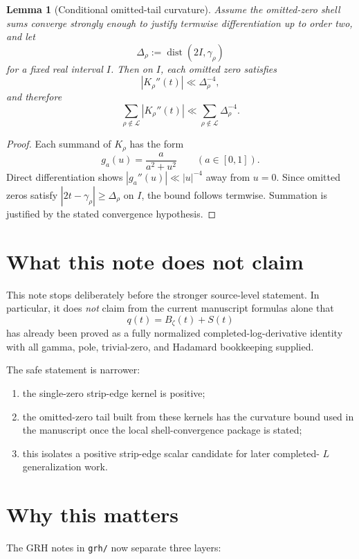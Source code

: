 \documentclass[11pt]{article}
\newtheorem{lemma}{Lemma}
\begin{document}
\begin{lemma}[Conditional omitted-tail curvature]
Assume the omitted-zero shell sums converge strongly enough to justify termwise
differentiation up to order two, and let
\[
\Delta_\rho:=\operatorname{dist}(2I,\gamma_\rho)
\]
for a fixed real interval \(I\). Then on \(I\), each omitted zero satisfies
\[
|K_\rho''(t)|\ll \Delta_\rho^{-4},
\]
and therefore
\[
\sum_{\rho\notin \mathcal L}|K_\rho''(t)|
\ll
\sum_{\rho\notin \mathcal L}\Delta_\rho^{-4}.
\]
\end{lemma}

\begin{proof}
Each summand of \(K_\rho\) has the form
\[
g_a(u)=\frac{a}{a^2+u^2}
\qquad (a\in[0,1]).
\]
Direct differentiation shows \(|g_a''(u)|\ll |u|^{-4}\) away from \(u=0\).
Since omitted zeros satisfy \(|2t-\gamma_\rho|\ge \Delta_\rho\) on \(I\), the
bound follows termwise. Summation is justified by the stated convergence
hypothesis.
\end{proof}

\section{What this note does not claim}

This note stops deliberately before the stronger source-level statement. In
particular, it does \emph{not} claim from the current manuscript formulas alone
that
\[
q(t)=B_\zeta(t)+S(t)
\]
has already been proved as a fully normalized completed-log-derivative identity
with all gamma, pole, trivial-zero, and Hadamard bookkeeping supplied.

The safe statement is narrower:

\begin{enumerate}
\item the single-zero strip-edge kernel is positive;
\item the omitted-zero tail built from these kernels has the curvature bound used
in the manuscript once the local shell-convergence package is stated;
\item this isolates a positive strip-edge scalar candidate for later completed-
\(L\) generalization work.
\end{enumerate}

\section{Why this matters}

The GRH notes in \texttt{grh/} now separate three layers:
\end{document}
